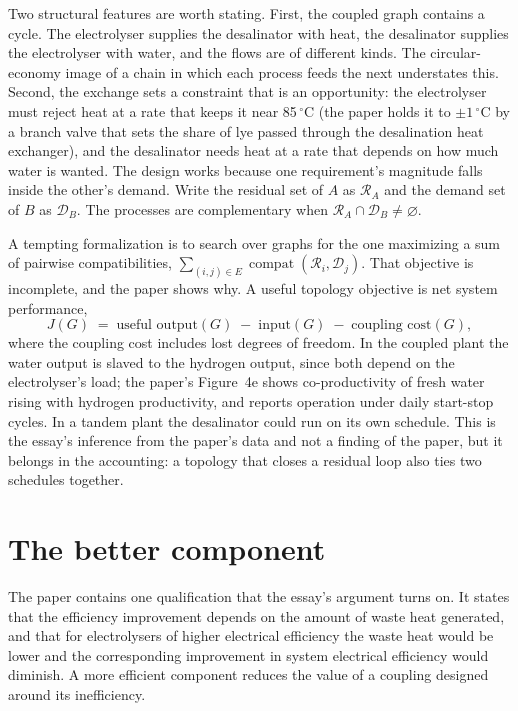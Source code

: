 \documentclass[11pt]{article}
\theoremstyle{definition}
\theoremstyle{remark}
\begin{document}
Two structural features are worth stating. First, the coupled graph contains a cycle. The electrolyser supplies the desalinator with heat, the desalinator supplies the electrolyser with water, and the flows are of different kinds. The circular-economy image of a chain in which each process feeds the next understates this. Second, the exchange sets a constraint that is an opportunity: the electrolyser must reject heat at a rate that keeps it near 85\,$^{\circ}$C (the paper holds it to $\pm1\,^{\circ}$C by a branch valve that sets the share of lye passed through the desalination heat exchanger), and the desalinator needs heat at a rate that depends on how much water is wanted. The design works because one requirement's magnitude falls inside the other's demand. Write the residual set of $A$ as $\mathcal{R}_A$ and the demand set of $B$ as $\mathcal{D}_B$. The processes are complementary when $\mathcal{R}_A\cap\mathcal{D}_B\neq\varnothing$.

A tempting formalization is to search over graphs for the one maximizing a sum of pairwise compatibilities, $\sum_{(i,j)\in E}\operatorname{compat}(\mathcal{R}_i,\mathcal{D}_j)$. That objective is incomplete, and the paper shows why. A useful topology objective is net system performance,
\[
  J(G) \;=\; \text{useful output}(G)\;-\;\text{input}(G)\;-\;\text{coupling cost}(G),
\]
where the coupling cost includes lost degrees of freedom. In the coupled plant the water output is slaved to the hydrogen output, since both depend on the electrolyser's load; the paper's Figure~4e shows co-productivity of fresh water rising with hydrogen productivity, and reports operation under daily start-stop cycles. In a tandem plant the desalinator could run on its own schedule. This is the essay's inference from the paper's data and not a finding of the paper, but it belongs in the accounting: a topology that closes a residual loop also ties two schedules together.

\section{The better component}

The paper contains one qualification that the essay's argument turns on. It states that the efficiency improvement depends on the amount of waste heat generated, and that for electrolysers of higher electrical efficiency the waste heat would be lower and the corresponding improvement in system electrical efficiency would diminish. A more efficient component reduces the value of a coupling designed around its inefficiency.
\end{document}
